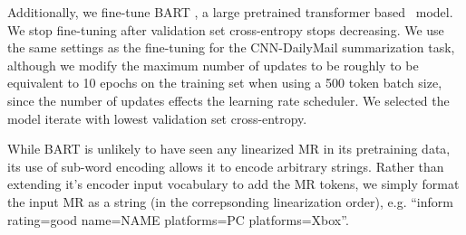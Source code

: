 %
%
%
%
%

Additionally, we
fine-tune BART \cite{lewis2019bart}, a large pretrained transformer based 
\sequencetosequence~model. We stop fine-tuning after validation set cross-entropy stops decreasing.
We use the same settings as the fine-tuning for the CNN-DailyMail
summarization task,
although we modify the maximum number of updates to be roughly to be
equivalent to 10 epochs on the training set when using a 500 token batch
size, since
the number of updates effects
the learning rate scheduler. We selected the model iterate with
lowest validation set cross-entropy.

While BART is unlikely to have seen any linearized MR in its pretraining
data, its use of sub-word encoding  allows it to encode
arbitrary strings. Rather than extending it's encoder input vocabulary to
add the MR tokens, we simply format the input MR as a string
(in the correpsonding linearization order), e.g. ``inform rating=good name=NAME platforms=PC platforms=Xbox''.


